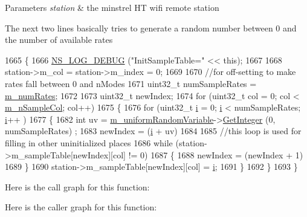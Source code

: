 \begin{DoxyParams}{Parameters}
{\em station} & the minstrel HT wifi remote station \\
\hline
\end{DoxyParams}
The next two lines basically tries to generate a random number between 0 and the number of available rates
\begin{DoxyCode}
1665 \{
1666   \hyperlink{group__logging_ga413f1886406d49f59a6a0a89b77b4d0a}{NS\_LOG\_DEBUG} (\textcolor{stringliteral}{"InitSampleTable="} << \textcolor{keyword}{this});
1667 
1668   station->m\_col = station->m\_index = 0;
1669 
1670   \textcolor{comment}{//for off-setting to make rates fall between 0 and nModes}
1671   uint32\_t numSampleRates = \hyperlink{classns3_1_1MinstrelHtWifiManager_a2f3d0e7f6c298a40dbc8699805103142}{m\_numRates};
1672 
1673   uint32\_t newIndex;
1674   \textcolor{keywordflow}{for} (uint32\_t col = 0; col < \hyperlink{classns3_1_1MinstrelHtWifiManager_afc2db9ea273b3599cb09ccbf73f866e0}{m\_nSampleCol}; col++)
1675     \{
1676       \textcolor{keywordflow}{for} (uint32\_t \hyperlink{bernuolliDistribution_8m_a6f6ccfcf58b31cb6412107d9d5281426}{i} = 0; \hyperlink{bernuolliDistribution_8m_a6f6ccfcf58b31cb6412107d9d5281426}{i} < numSampleRates; \hyperlink{bernuolliDistribution_8m_a6f6ccfcf58b31cb6412107d9d5281426}{i}++ )
1677         \{
1682           \textcolor{keywordtype}{int} uv = \hyperlink{classns3_1_1MinstrelHtWifiManager_ad2dbdd143ca703a4366ed562b6ece239}{m\_uniformRandomVariable}->\hyperlink{classns3_1_1RandomVariableStream_a66cd94e6305ce7f000f1a9ff0fcb9aef}{GetInteger} (0, numSampleRates)
      ;
1683           newIndex = (\hyperlink{bernuolliDistribution_8m_a6f6ccfcf58b31cb6412107d9d5281426}{i} + uv) %
1684 
1685           \textcolor{comment}{//this loop is used for filling in other uninitialized places}
1686           \textcolor{keywordflow}{while} (station->m\_sampleTable[newIndex][col] != 0)
1687             \{
1688               newIndex = (newIndex + 1) %
1689             \}
1690           station->m\_sampleTable[newIndex][col] = \hyperlink{bernuolliDistribution_8m_a6f6ccfcf58b31cb6412107d9d5281426}{i};
1691         \}
1692     \}
1693 \}
\end{DoxyCode}


Here is the call graph for this function\+:




Here is the caller graph for this function\+:


